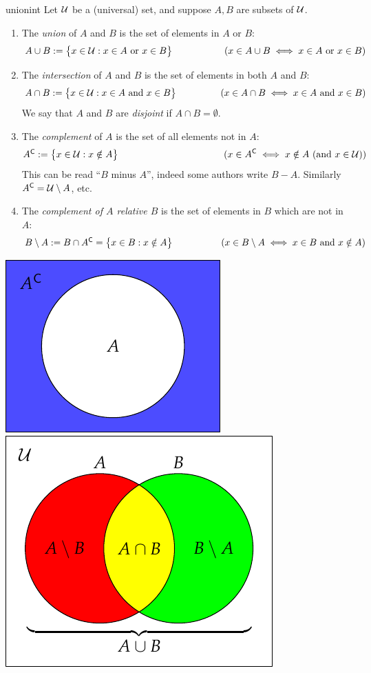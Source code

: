 \begin{defn}{}{unionint}
	Let $\mathcal{U}$ be a (universal) set,\footnotemark{} and suppose $A,B$ are subsets of $\mathcal{U}$.
	\begin{enumerate}\itemsep0pt
		\item The \emph{union} of $A$ and $B$ is the set of elements in $A$ or $B$:
		\[
			\makebox[210pt][l]{$A\cup B:=\bigl\{x\in\cU:x\in A\text{ or }x\in B\bigr\}$\hfill} (x\in A\cup B\iff x\in A\text{ or }x\in B)
		\]
		\item The \emph{intersection} of $A$ and $B$ is the set of elements in both $A$ and $B$:
		\[
			\makebox[210pt][l]{$A\cap B:=\bigl\{x\in\cU:x\in A\text{ and }x\in B\bigr\}$\hfill} (x\in A\cap B\iff x\in A\text{ and }x\in B)
		\]
		We say that $A$ and $B$ are \emph{disjoint} if $A\cap B=\emptyset$.
	  \item The \emph{complement} of $A$ is the set of all elements not in $A$:
		\[
			\makebox[210pt][l]{$\comp A:=\bigl\{x\in\cU:x\notin A\bigr\}$ \hfill} (x\in\comp A\iff x\notin A \ (\text{and }x\in\cU))
		\]
		This can be read ``$B$ minus $A$'', indeed some authors write $B-A$. Similarly ${A}^{\mathsf{C}}=\mathcal{U}\setminus A$, etc.
		\item The \emph{complement of $A$ relative $B$} is the set of elements in $B$ which are not in $A$:
		\[
			\makebox[210pt][l]{$B\setminus A:=B\cap \comp A=\bigl\{x\in B:x\notin A\bigr\}$\hfill} (x\in B\setminus A\iff x\in B\text{ and } x\notin A)
		\]
	\end{enumerate}
	
	\begin{center}
		\includegraphics{sets-05-venncomp}
		\qquad\qquad
		\includegraphics{sets-04-vennunion}
	\end{center}
\end{defn}

